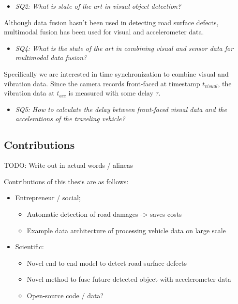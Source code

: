 \begin{itemize}
\item \textit{SQ2: What is state of the art in visual object detection?}
\end{itemize}

Although data fusion hasn't been used in detecting road surface defects, multimodal fusion has been used for visual and accelerometer data.

\begin{itemize}
\item \textit{SQ4: What is the state of the art in combining visual and sensor data for multimodal data fusion?}
\end{itemize}

Specifically we are interested in time synchronization to combine visual and vibration data. Since the camera records front-faced at timestamp $t_{visual}$, the vibration data at $t_{acc}$ is measured with some delay $\tau$. 

\begin{itemize}
\item \textit{SQ5: How to calculate the delay between front-faced visual data and the accelerations of the traveling vehicle?}
\end{itemize}


\subsection{Contributions}

TODO: Write out in actual words / alineas

Contributions of this thesis are as follows:
\begin{itemize}
\item Entrepreneur / social; 
\begin{itemize}
\item Automatic detection of road damages -> saves costs
\item Example data architecture of processing vehicle data on large scale
\end{itemize}
\item Scientific:
\begin{itemize}
\item Novel end-to-end model to detect road surface defects
\item Novel method to fuse future detected object with accelerometer data
\item Open-source code / data?
\end{itemize}
\end{itemize}



